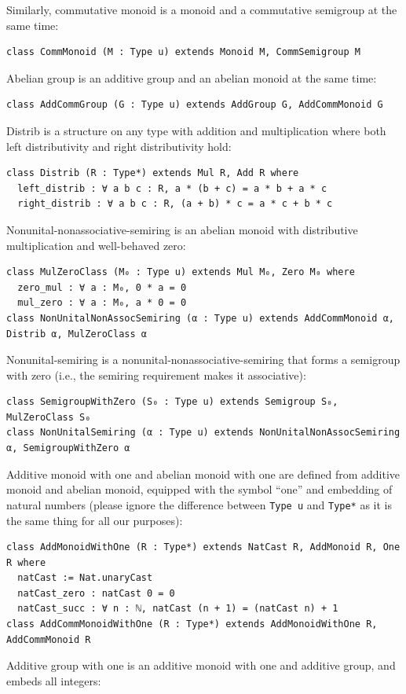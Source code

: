 \documentclass[]{article}
\renewcommand{\.}{\hskip .75pt}
\begin{document}
Similarly, commutative monoid is a monoid and a commutative semigroup at the same time:
\begin{lstlisting}
class CommMonoid (M : Type u) extends Monoid M, CommSemigroup M
\end{lstlisting}
Abelian group is an additive group and an abelian monoid at the same time:
\begin{lstlisting}
class AddCommGroup (G : Type u) extends AddGroup G, AddCommMonoid G
\end{lstlisting}
Distrib is a structure on any type with addition and multiplication where
both left distributivity and right distributivity hold:
\begin{lstlisting}
class Distrib (R : Type*) extends Mul R, Add R where
  left_distrib : ∀ a b c : R, a * (b + c) = a * b + a * c
  right_distrib : ∀ a b c : R, (a + b) * c = a * c + b * c
\end{lstlisting}
Nonunital-nonassociative-semiring is an abelian monoid with distributive multiplication and well-behaved zero:
\begin{lstlisting}
class MulZeroClass (M₀ : Type u) extends Mul M₀, Zero M₀ where
  zero_mul : ∀ a : M₀, 0 * a = 0
  mul_zero : ∀ a : M₀, a * 0 = 0
class NonUnitalNonAssocSemiring (α : Type u) extends AddCommMonoid α, Distrib α, MulZeroClass α
\end{lstlisting}
Nonunital-semiring is a nonunital-nonassociative-semiring that forms a semigroup with zero (i.e., the
semiring requirement makes it associative):
\begin{lstlisting}
class SemigroupWithZero (S₀ : Type u) extends Semigroup S₀, MulZeroClass S₀
class NonUnitalSemiring (α : Type u) extends NonUnitalNonAssocSemiring α, SemigroupWithZero α
\end{lstlisting}
Additive monoid with one and abelian monoid with one are defined from additive monoid
and abelian monoid, equipped with the symbol ``one'' and embedding of natural numbers
(please ignore the difference between \texttt{Type u} and \texttt{Type*} as it is the same thing
for all our purposes):
\begin{lstlisting}
class AddMonoidWithOne (R : Type*) extends NatCast R, AddMonoid R, One R where
  natCast := Nat.unaryCast
  natCast_zero : natCast 0 = 0
  natCast_succ : ∀ n : ℕ, natCast (n + 1) = (natCast n) + 1 
class AddCommMonoidWithOne (R : Type*) extends AddMonoidWithOne R, AddCommMonoid R
\end{lstlisting}
Additive group with one is an additive monoid with one and additive group, and embeds all integers:
\end{document}

